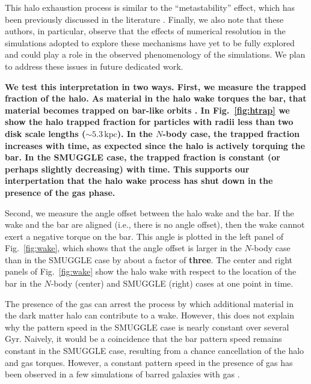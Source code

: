 \documentclass[twocolumn,linenumbers,trackchanges]{aastex631}
\newcommand{\Nbody}{$N$-body}
\newcommand{\SMUGGLE}{SMUGGLE}
\begin{document}
This halo exhaustion process is similar to the ``metastability'' effect, which
has been previously discussed in the literature \citep{2003MNRAS.345..406V,
2006ApJ...639..868S}. Finally, we also note that these authors, in particular,
observe that the effects of numerical resolution in the simulations adopted to
explore these mechanisms have yet to be fully explored and could play a role in
the observed phenomenology of the simulations. We plan to address these issues
in future dedicated work.

{\bf We test this interpretation in two ways. First, we measure the trapped
fraction of the halo. As material in the halo wake torques the bar, that
material becomes trapped on bar-like orbits \citep[the ``shadow
bar'';][]{2016MNRAS.463.1952P}. In Fig.~\ref{fig:htrap} we show the halo trapped
fraction for particles with radii less than two disk scale lengths
($\sim5.3\,\textrm{kpc}$). In the \Nbody{} case, the trapped fraction increases
with time, as expected since the halo is actively torquing the bar. In the
\SMUGGLE{} case, the trapped fraction is constant (or perhaps slightly
decreasing) with time. This supports our interpertation that the halo wake
process has shut down in the presence of the gas phase.}

Second, we measure the angle offset between the halo wake and the bar. If the
wake and the bar are aligned (i.e., there is no angle offset), then the wake
cannot exert a negative torque on the bar. This angle is plotted in the left
panel of Fig.~\ref{fig:wake}, which shows that the angle offset is larger in the
\Nbody{} case than in the \SMUGGLE{} case by about a factor of {\bf three}. The
center and right panels of Fig.~\ref{fig:wake} show the halo wake with respect
to the location of the bar in the \Nbody{} (center) and \SMUGGLE{} (right) cases
at one point in time.

The presence of the gas can arrest the process by which additional material in
the dark matter halo can contribute to a wake. However, this does not explain
why the pattern speed in the \SMUGGLE{} case is nearly constant over several
Gyr. Naively, it would be a coincidence that the bar pattern speed remains
constant in the \SMUGGLE{} case, resulting from a chance cancellation of the
halo and gas torques. However, a constant pattern speed in the presence of gas
has been observed in a few simulations of barred galaxies with gas
\citep{1993AA...268...65F, 2007ApJ...666..189B, 2009ApJ...707..218V,
2010ApJ...719.1470V, 2014MNRAS.438L..81A}.
\end{document}
